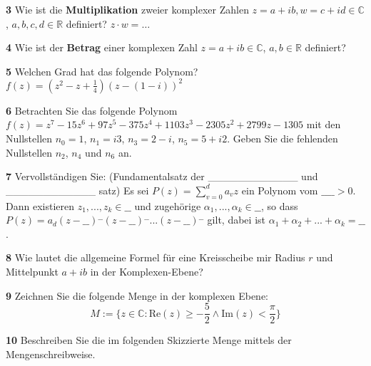 \documentclass[11pt]{article}
\begin{document}
    \textbf{3} Wie ist die \textbf{Multiplikation} zweier komplexer Zahlen \( z = a + ib, w = c + id \in \mathbb{C} \), \( a,b,c,d \in \mathbb{R} \) definiert? \( z \cdot w = \ldots \)

    \textbf{4} Wie ist der \textbf{Betrag} einer komplexen Zahl \( z = a + ib \in \mathbb{C} \), \( a,b \in \mathbb{R} \) definiert?

    \textbf{5} Welchen Grad hat das folgende Polynom? \(f(z) = (z^2 - z + \frac{1}{4})(z - (1 - i))^2\)

    \textbf{6} Betrachten Sie das folgende Polynom \(f(z) = z^7 - 15z^6 + 97z^5 - 375z^4 + 1103z^3 - 2305z^2 + 2799z - 1305\) mit den Nullstellen \(n_0 = 1\), \(n_1 = i3\), \(n_3 = 2 - i\), \(n_5 = 5 + i2\). Geben Sie die fehlenden Nullstellen \(n_2\), \(n_4\) und \(n_6\) an.

    \textbf{7} Vervollständigen Sie:
(Fundamentalsatz der \_\_\_\_\_\_\_\_\_\_\_\_ und \_\_\_\_\_\_\_\_\_\_\_\_ satz) Es sei
\( P(z) = \sum_{v=0}^{d} a_v z \)
ein Polynom vom \( \_\_\_\_ > 0 \). Dann existieren \( z_1, ..., z_k \in \_\_ \) und zugehörige \( \alpha_1, ..., \alpha_k \in \_\_ \), so dass
\( P(z) = a_d (z-\_\_)^{\_\_} (z-\_\_)^{\_\_} ... (z-\_\_)^{\_\_} \)
gilt, dabei ist \( \alpha_1 + \alpha_2 + ... + \alpha_k = \_\_ \).

    \textbf{8} Wie lautet die allgemeine Formel für eine Kreisscheibe mir Radius $r$ und Mittelpunkt $a + ib$ in der Komplexen-Ebene?

    \textbf{9} Zeichnen Sie die folgende Menge in der komplexen Ebene:
\[ M := \{ z \in \mathbb{C} : \text{Re}(z) \geq -\frac{5}{2} \land \text{Im}(z) < \frac{\pi}{2} \} \]

    \textbf{10} Beschreiben Sie die im folgenden Skizzierte Menge mittels der Mengenschreibweise.
\end{document}
